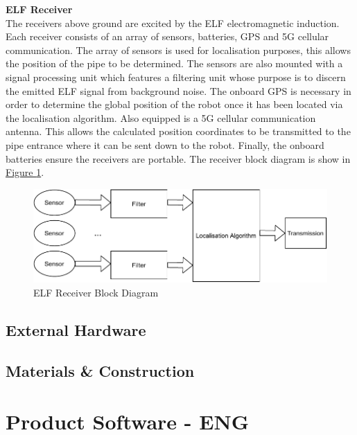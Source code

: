 \documentclass[11pt]{article}		%
\newcommand{\figref}[1]{\hyperref[#1]{Figure \ref*{#1}}}    %
\begin{document}
		
		
		\textbf{ELF Receiver}\\
		The receivers above ground are excited by the ELF electromagnetic induction. Each receiver consists of an array of sensors, batteries, GPS and 5G cellular communication. The array of sensors is used for localisation purposes, this allows the position of the pipe to be determined. The sensors are also mounted with a signal processing unit which features a filtering unit whose purpose is to discern the emitted ELF signal from background noise. The onboard GPS is necessary in order to determine the global position of the robot once it has been located via the localisation algorithm. Also equipped is a 5G cellular communication antenna. This allows the calculated position coordinates to be transmitted to the pipe entrance where it can be sent down to the robot.  Finally, the onboard batteries ensure the receivers are portable. The receiver block diagram is show in \figref{ELFrec}.
	    
	    \begin{figure}[h]
			\centering
			\includegraphics[scale=0.7]{blockreceiever.pdf}
			\caption{ELF Receiver Block Diagram}
			\label{ELFrec}
		\end{figure}
	
		\subsection{External Hardware}
		
		
	
		\subsection{Materials \& Construction}
		
	
	\section{Product Software - ENG}
		
\end{document}
